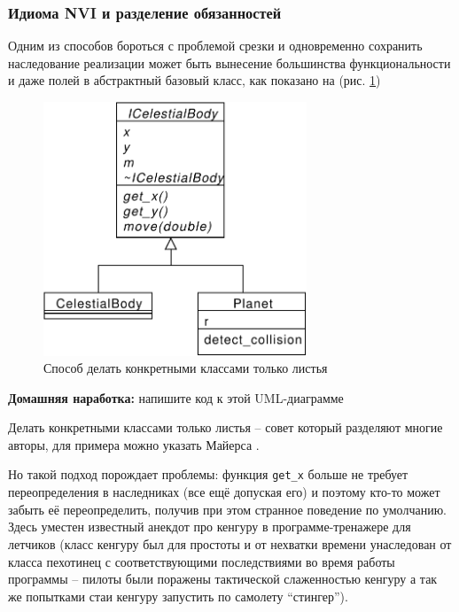 \documentclass[a4paper,12pt,oneside]{article}
\begin{document}
\subsubsection{Идиома NVI и разделение обязанностей}\label{NVI}

Одним из способов бороться с проблемой срезки и одновременно сохранить наследование реализации может быть вынесение большинства функциональности и даже полей в абстрактный базовый класс, как показано на (рис. \ref{fig:better-implinhh})

\begin{figure}[h!]
\centering
\includegraphics[width=0.7\textwidth]{illustrations/better-implinh-crop.pdf}
\caption{Способ делать конкретными классами только листья}
\label{fig:better-implinhh}
\end{figure}

\textbf{Домашняя наработка:} напишите код к этой UML-диаграмме

Делать конкретными классами только листья -- совет который разделяют многие авторы, для примера можно указать Майерса \cite{effcpp3d}.

Но такой подход порождает проблемы: функция \lstinline!get_x! больше не требует переопределения в наследниках (все ещё допуская его) и поэтому кто-то может забыть её переопределить, получив при этом странное поведение по умолчанию. Здесь уместен известный анекдот про кенгуру в программе-тренажере для летчиков (класс кенгуру был для простоты и от нехватки времени унаследован от класса пехотинец с соответствующими последствиями во время работы программы -- пилоты были поражены тактической слаженностью кенгуру а так же попытками стаи кенгуру запустить по самолету ``стингер'').
\end{document}
